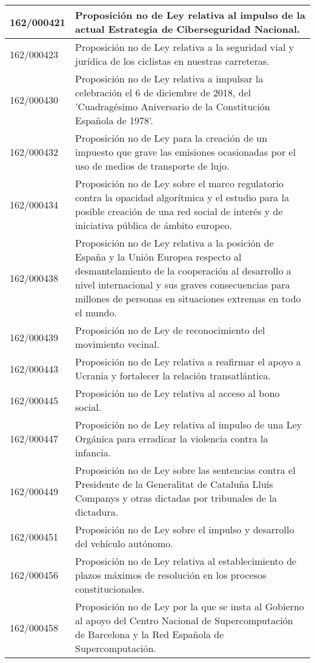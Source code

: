 {\begin{table}[H]
\begin{center}
\begin{tabularx}{\linewidth}{| l | X |}
\hline
162/000421 & Proposición no de Ley relativa al impulso de la actual Estrategia de Ciberseguridad Nacional. \\
\hline
162/000423 & Proposición no de Ley relativa a la seguridad vial y jurídica de los ciclistas en nuestras carreteras. \\
\hline
162/000430 & Proposición no de Ley relativa a impulsar la celebración el 6 de diciembre de 2018, del 'Cuadragésimo Aniversario de la Constitución Española de 1978'. \\
\hline
162/000432 & Proposición no de Ley para la creación de un impuesto que grave las emisiones ocasionadas por el uso de medios de transporte de lujo. \\
\hline
162/000434 & Proposición no de Ley sobre el marco regulatorio contra la opacidad algorítmica y el estudio para la posible creación de una red social de interés y de iniciativa pública de ámbito europeo. \\
\hline
162/000438 & Proposición no de Ley relativa a la posición de España y la Unión Europea respecto al desmantelamiento de la cooperación al desarrollo a nivel internacional y sus graves consecuencias para millones de personas en situaciones extremas en todo el mundo. \\
\hline
162/000439 & Proposición no de Ley de reconocimiento del movimiento vecinal. \\
\hline
162/000443 & Proposición no de Ley relativa a reafirmar el apoyo a Ucrania y fortalecer la relación transatlántica. \\
\hline
162/000445 & Proposición no de Ley relativa al acceso al bono social. \\
\hline
162/000447 & Proposición no de Ley relativa al impulso de una Ley Orgánica para erradicar la violencia contra la infancia. \\
\hline
162/000449 & Proposición no de Ley sobre las sentencias contra el Presidente de la Generalitat de Cataluña Lluís Companys y otras dictadas por tribunales de la dictadura. \\
\hline
162/000451 & Proposición no de Ley sobre el impulso y desarrollo del vehículo autónomo. \\
\hline
162/000456 & Proposición no de Ley relativa al establecimiento de plazos máximos de resolución en los procesos constitucionales. \\
\hline
162/000458 & Proposición no de Ley por la que se insta al Gobierno al apoyo del Centro Nacional de Supercomputación de Barcelona y la Red Española de Supercomputación. \\

\end{tabularx}
\end{center}
\end{table}}
